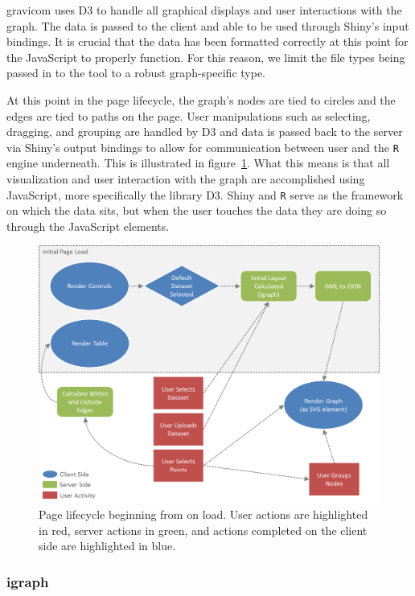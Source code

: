 \documentclass{article}\usepackage[]{graphicx}\usepackage[]{color}
\begin{document}
gravicom uses D3 to handle all graphical displays and user interactions with the graph. The data is passed to the client and able to be used through Shiny's input bindings. It is crucial that the data has been formatted correctly at this point for the JavaScript to properly function. For this reason, we limit the file types being passed in to the tool to a robust graph-specific type.

At this point in the page lifecycle, the graph's nodes are tied to circles and the edges are tied to paths on the page. User manipulations such as selecting, dragging, and grouping are handled by D3 and  data is passed back to the server via Shiny's output bindings to allow for communication between user and the {\tt R} engine underneath. This is illustrated in figure~\ref{fig:pagelifecycle}. What this means is that all visualization and user interaction with the graph are accomplished using JavaScript, more specifically the library D3. Shiny and {\tt R} serve as the framework on which the data sits, but when the user touches the data they are doing so through the JavaScript elements. 

\begin{figure}[H]
\centering
\includegraphics[width=\textwidth]{images/pagelifecycle.png}
\caption{\label{fig:pagelifecycle} Page lifecycle beginning from on load. User actions are highlighted in red, server actions in green, and actions completed on the client side are highlighted in blue.}
\end{figure}


\subsubsection{igraph}
\end{document}
